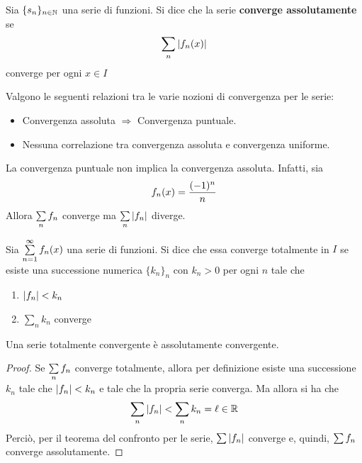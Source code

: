\begin{definition}
    Sia $\{s_n\}_{n \in \mathbb{N}}$ una serie di funzioni. Si dice che la serie \textbf{converge assolutamente}  se
    \begin{equation}
        \sum_{n}{|f_n(x)|}
    \end{equation}
    converge per ogni $x \in I$
\end{definition} 
\begin{oss}
Valgono le seguenti relazioni tra le varie nozioni di convergenza per le serie:
\begin{itemize}
    \item Convergenza assoluta $\Rightarrow$ Convergenza puntuale.
    \item  Nessuna correlazione tra convergenza assoluta e convergenza uniforme.
\end{itemize}
\end{oss}
\begin{example}
    La convergenza puntuale non implica la convergenza assoluta. Infatti, sia
    \begin{equation*}
        f_n(x)=\frac{(-1)^n}{n}
    \end{equation*}
    Allora $\sum\limits_{n}{f_n}$ converge ma $\sum\limits_{n}{|f_n|}$ diverge.
\end{example}
\begin{definition}
    Sia $\sum\limits_{n=1}^{\infty}{f_n(x)}$ una serie di funzioni. Si dice che essa converge totalmente in $I$ se esiste una successione numerica $\{k_n\}_n$ con $k_n>0$ per ogni $n$ tale che
    \begin{enumerate}
        \item $|f_n|<k_n$
        \item $\sum\limits_{n}{k_n}$ converge
    \end{enumerate}
\end{definition}
\begin{proposition}
    Una serie totalmente convergente è assolutamente convergente.
\end{proposition}
\begin{proof}
    Se $\sum\limits_{n}f_n$ converge totalmente, allora per definizione esiste una successione $k_n$ tale che $|f_n|<k_n$ e tale che la propria serie converga. Ma allora si ha che
    \begin{equation}
        \sum_{n}{|f_n|} < \sum_{n}{k_n}= \ell \in \mathbb{R}
    \end{equation}
    Perciò, per il teorema del confronto per le serie, $\sum\limits{|f_n|}$ converge e, quindi, $\sum\limits{f_n}$ converge assolutamente.
\end{proof}
